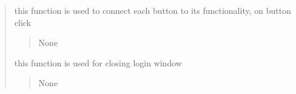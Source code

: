 \documentclass[letterpaper,10pt,english]{sphinxmanual}
\begin{document}
\begin{quote}
\begin{savenotes}
\begin{fulllineitems}
\begin{savenotes}
\begin{fulllineitems}
\begin{quote}
\begin{description}
\end{description}\end{quote}

\end{fulllineitems}\end{savenotes}


\begin{savenotes}\begin{fulllineitems}
\label{\detokenize{setting/confirm_UI:oxin.confirm_UI.UI_main_window.buttonClick}}
\pysigstartsignatures
{}
\pysigstopsignatures
\sphinxAtStartPar
this function is used to connect each button to its functionality, on button click
\begin{quote}\begin{description}
\sphinxAtStartPar
None

\end{description}\end{quote}

\end{fulllineitems}\end{savenotes}


\begin{savenotes}\begin{fulllineitems}
\label{\detokenize{setting/confirm_UI:oxin.confirm_UI.UI_main_window.close_win}}
\pysigstartsignatures
{}
\pysigstopsignatures
\sphinxAtStartPar
this function is used for closing login window
\begin{quote}\begin{description}
\sphinxAtStartPar
None

\end{description}\end{quote}

\end{fulllineitems}\end{savenotes}



\end{fulllineitems}
\end{savenotes}
\end{quote}
\end{document}

